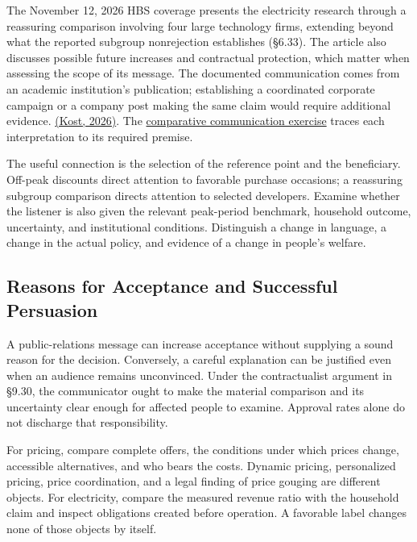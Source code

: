 The November 12, 2026 HBS coverage presents the electricity research
through a reassuring comparison involving four large technology firms,
extending beyond what the reported subgroup nonrejection establishes
(§6.33). The article also discusses possible future increases and
contractual protection, which matter when assessing the scope of its
message. The documented communication comes from an academic
institution's publication; establishing a coordinated corporate campaign
or a company post making the same claim would require additional
evidence.
\href{https://www.library.hbs.edu/working-knowledge/blaming-data-centers-for-higher-electric-bills-its-not-that-simple}{(Kost,
2026)}. The
\href{../01_Resources/41_Statistical_Claims_and_Decisions/PUBLIC_COMMUNICATION_AND_PUBLICATION.md}{comparative
communication exercise} traces each interpretation to its required
premise.

The useful connection is the selection of the reference point and the
beneficiary. Off-peak discounts direct attention to favorable purchase
occasions; a reassuring subgroup comparison directs attention to
selected developers. Examine whether the listener is also given the
relevant peak-period benchmark, household outcome, uncertainty, and
institutional conditions. Distinguish a change in language, a change in
the actual policy, and evidence of a change in people's welfare.

\hypertarget{M09-reasons-for-acceptance-and-successful-persuasion}{%
\subsection{Reasons for Acceptance and Successful
Persuasion}\label{M09-reasons-for-acceptance-and-successful-persuasion}}

\noindent \noindent A public-relations message can increase acceptance without
supplying a sound reason for the decision. Conversely, a careful
explanation can be justified even when an audience remains unconvinced.
Under the contractualist argument in §9.30, the communicator ought to
make the material comparison and its uncertainty clear enough for
affected people to examine. Approval rates alone do not discharge that
responsibility.

For pricing, compare complete offers, the conditions under which prices
change, accessible alternatives, and who bears the costs. Dynamic
pricing, personalized pricing, price coordination, and a legal finding
of price gouging are different objects. For electricity, compare the
measured revenue ratio with the household claim and inspect obligations
created before operation. A favorable label changes none of those
objects by itself.


